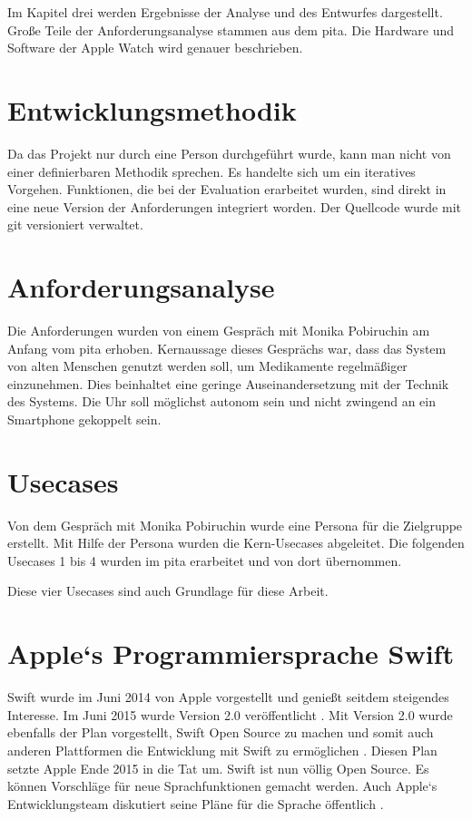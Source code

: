 Im Kapitel drei werden Ergebnisse der Analyse und des Entwurfes dargestellt. Große Teile der Anforderungsanalyse stammen aus dem \gls{pita}. Die Hardware und Software der Apple Watch wird genauer beschrieben.
\section{Entwicklungsmethodik}
Da das Projekt nur durch eine Person durchgeführt wurde, kann man nicht von einer definierbaren Methodik sprechen. Es handelte sich um ein iteratives Vorgehen. Funktionen, die bei der Evaluation erarbeitet wurden, sind direkt in eine neue Version der Anforderungen integriert worden. Der Quellcode wurde mit \gls{git} versioniert verwaltet.
\section{Anforderungsanalyse}
Die Anforderungen wurden von einem Gespräch mit Monika Pobiruchin am Anfang vom \gls{pita} erhoben. Kernaussage dieses Gesprächs war, dass das System von alten Menschen genutzt werden soll, um Medikamente regelmäßiger einzunehmen. Dies beinhaltet eine geringe Auseinandersetzung mit der Technik des Systems. Die Uhr soll möglichst autonom sein und nicht zwingend an ein Smartphone gekoppelt sein.

\section{Usecases} 
Von dem Gespräch mit Monika Pobiruchin wurde eine Persona für die Zielgruppe erstellt.
Mit Hilfe der Persona wurden die Kern-Usecases abgeleitet. Die folgenden Usecases 1 bis 4 wurden im \gls{pita} erarbeitet und von dort übernommen. 

Diese vier Usecases sind auch Grundlage für diese Arbeit.

\section{Apple`s Programmiersprache Swift}
Swift wurde im Juni 2014 von Apple vorgestellt und genießt seitdem steigendes Interesse. Im Juni 2015 wurde Version 2.0 veröffentlicht \cite{Apple:2014sp}. Mit Version 2.0 wurde ebenfalls der Plan vorgestellt, Swift Open Source zu machen und somit auch anderen Plattformen die Entwicklung mit Swift zu ermöglichen \cite{Apple:2014sp}. Diesen Plan setzte Apple Ende 2015 in die Tat um. Swift ist nun völlig Open Source. Es können Vorschläge für neue Sprachfunktionen gemacht werden. Auch Apple`s Entwicklungsteam diskutiert seine Pläne für die Sprache öffentlich \cite{Apple:2015swiftOpen}.

